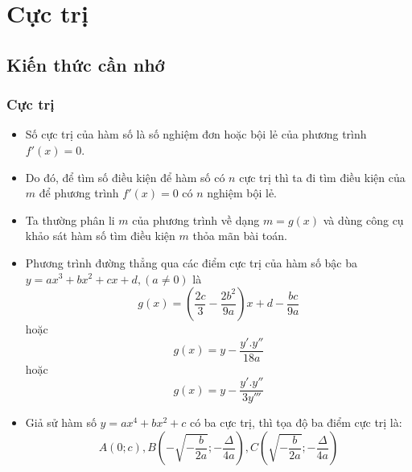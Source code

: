 \section{Cực trị}
\subsection{Kiến thức cần nhớ}
\begin{khung}
	\subsubsection{Cực trị}
	\begin{itemize}
		\item Số cực trị của hàm số là số nghiệm đơn hoặc bội lẻ của phương trình $f'(x)=0$.
		\item Do đó, để tìm số điều kiện để hàm số có $n$ cực trị thì ta đi tìm điều kiện của $m$  để phương trình $f'(x)=0$ có $n$ nghiệm bội lẻ.
		\item Ta thường phân li $m$ của phương trình về dạng $m=g(x)$ và dùng công cụ khảo sát hàm số tìm điều kiện $m$ thỏa mãn bài toán.
		\item Phương trình đường thẳng qua các điểm cực trị của hàm số bậc ba $y=ax^3+bx^2+cx+d,(a\ne 0 )$ là $$g(x)=\left( \dfrac{2c}{3}-\dfrac{2{{b}^{2}}}{9a} \right)x+d-\dfrac{bc}{9a} $$
		hoặc  $$ g( x )=y-\frac{{y}'.{y}''}{18a}$$
		 hoặc  $$g( x )=y-\frac{{y}'.{y}''}{3{y}'''}$$
		\item Giả sử hàm số $y=a{{x}^{4}}+b{{x}^{2}}+c$ có ba cực trị, thì tọa độ ba điểm cực trị là:
		$$A(0;c),B\left( -\sqrt{-\frac{b}{2a}};-\frac{\Delta }{4a} \right),C\left( \sqrt{-\frac{b}{2a}};-\frac{\Delta }{4a} \right)$$
		\end{itemize}
\end{khung}
